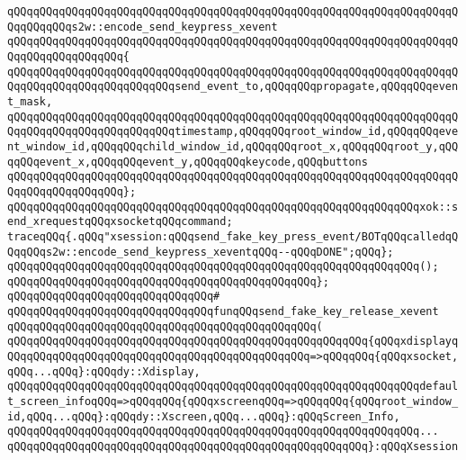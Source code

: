 \verb|qQQqqQQqqQQqqQQqqQQqqQQqqQQqqQQqqQQqqQQqqQQqqQQqqQQqqQQqqQQqqQQqqQQqqQQqqQQqqQQqs2w::encode_send_keypress_xevent|\newline
\verb|qQQqqQQqqQQqqQQqqQQqqQQqqQQqqQQqqQQqqQQqqQQqqQQqqQQqqQQqqQQqqQQqqQQqqQQqqQQqqQQqqQQqqQQq{|\newline
\verb|qQQqqQQqqQQqqQQqqQQqqQQqqQQqqQQqqQQqqQQqqQQqqQQqqQQqqQQqqQQqqQQqqQQqqQQqqQQqqQQqqQQqqQQqqQQqqQQqsend_event_to,qQQqqQQqpropagate,qQQqqQQqevent_mask,|\newline
\verb|qQQqqQQqqQQqqQQqqQQqqQQqqQQqqQQqqQQqqQQqqQQqqQQqqQQqqQQqqQQqqQQqqQQqqQQqqQQqqQQqqQQqqQQqqQQqqQQqtimestamp,qQQqqQQqroot_window_id,qQQqqQQqevent_window_id,qQQqqQQqchild_window_id,qQQqqQQqroot_x,qQQqqQQqroot_y,qQQqqQQqevent_x,qQQqqQQqevent_y,qQQqqQQqkeycode,qQQqbuttons|\newline
\verb|qQQqqQQqqQQqqQQqqQQqqQQqqQQqqQQqqQQqqQQqqQQqqQQqqQQqqQQqqQQqqQQqqQQqqQQqqQQqqQQqqQQqqQQq};|\newline
\newline
\verb|qQQqqQQqqQQqqQQqqQQqqQQqqQQqqQQqqQQqqQQqqQQqqQQqqQQqqQQqqQQqqQQqxok::send_xrequestqQQqxsocketqQQqcommand;|\newline
\newline
\verb|traceqQQq{.qQQq"xsession:qQQqsend_fake_key_press_event/BOTqQQqcalledqQQqqQQqs2w::encode_send_keypress_xeventqQQq--qQQqDONE";qQQq};|\newline
\verb|qQQqqQQqqQQqqQQqqQQqqQQqqQQqqQQqqQQqqQQqqQQqqQQqqQQqqQQqqQQqqQQq();|\newline
\verb|qQQqqQQqqQQqqQQqqQQqqQQqqQQqqQQqqQQqqQQqqQQqqQQq};|\newline
\verb|qQQqqQQqqQQqqQQqqQQqqQQqqQQqqQQq#|\newline
\verb|qQQqqQQqqQQqqQQqqQQqqQQqqQQqqQQqfunqQQqsend_fake_key_release_xevent|\newline
\verb|qQQqqQQqqQQqqQQqqQQqqQQqqQQqqQQqqQQqqQQqqQQqqQQq(|\newline
\verb|qQQqqQQqqQQqqQQqqQQqqQQqqQQqqQQqqQQqqQQqqQQqqQQqqQQqqQQq{qQQqxdisplayqQQqqQQqqQQqqQQqqQQqqQQqqQQqqQQqqQQqqQQqqQQqqQQq=>qQQqqQQq{qQQqxsocket,qQQq...qQQq}:qQQqdy::Xdisplay,|\newline
\verb|qQQqqQQqqQQqqQQqqQQqqQQqqQQqqQQqqQQqqQQqqQQqqQQqqQQqqQQqqQQqqQQqdefault_screen_infoqQQq=>qQQqqQQq{qQQqxscreenqQQq=>qQQqqQQq{qQQqroot_window_id,qQQq...qQQq}:qQQqdy::Xscreen,qQQq...qQQq}:qQQqScreen_Info,|\newline
\verb|qQQqqQQqqQQqqQQqqQQqqQQqqQQqqQQqqQQqqQQqqQQqqQQqqQQqqQQqqQQqqQQq...|\newline
\verb|qQQqqQQqqQQqqQQqqQQqqQQqqQQqqQQqqQQqqQQqqQQqqQQqqQQqqQQq}:qQQqXsession|\newline
